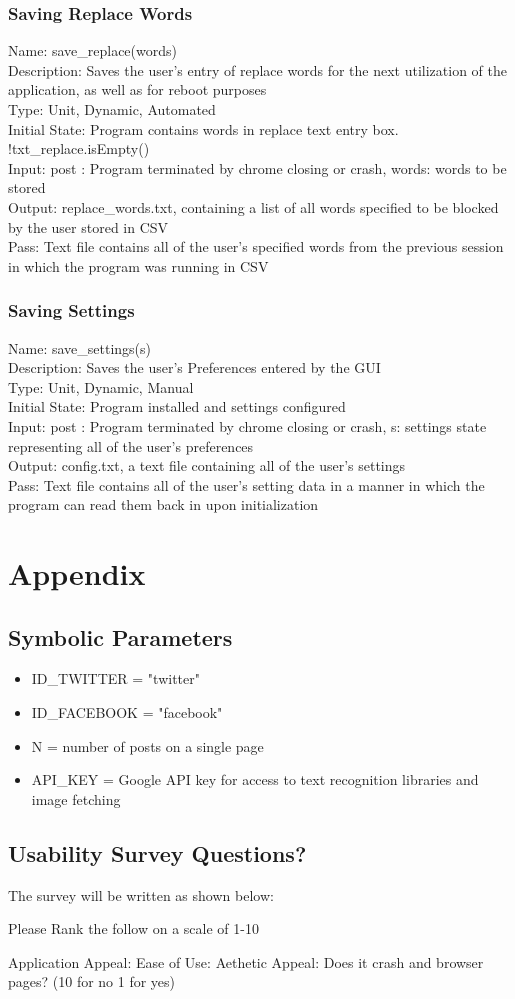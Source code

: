 \documentclass[12pt, titlepage]{article}
\begin{document}
\subsubsection{Saving Replace Words}
Name: save\_replace(words) \\
Description: Saves the user's entry of replace words for the next utilization of the application, as well as for reboot purposes \\
Type: Unit, Dynamic, Automated \\
Initial State: Program contains words in replace text entry box. !txt\_replace.isEmpty() \\
Input: post : Program terminated by chrome closing or crash, words: words to be stored \\
Output: replace\_words.txt, containing a list of all words specified to be blocked by the user stored in CSV \\
Pass: Text file contains all of the user's specified words from the previous session in which the program was running in CSV\\

\subsubsection{Saving Settings}
Name: save\_settings(s) \\
Description: Saves the user's Preferences entered by the GUI \\
Type: Unit, Dynamic, Manual \\
Initial State: Program installed and settings configured \\
Input: post : Program terminated by chrome closing or crash, s: settings state representing all of the user's preferences \\
Output: config.txt, a text file containing all of the user's settings \\
Pass: Text file contains all of the user's setting data in a manner in which the program can read them back in upon initialization\\

\newpage
\section{Appendix}
\subsection{Symbolic Parameters}
\begin{itemize}
  \item ID\_TWITTER = "twitter"
  \item ID\_FACEBOOK = "facebook"
  \item N = number of posts on a single page
  \item API\_KEY = Google API key for access to text recognition libraries and image fetching
\end{itemize}
\subsection{Usability Survey Questions?}
The survey will be written as shown below:

Please Rank the follow on a scale of 1-10

Application Appeal:
Ease of Use:
Aethetic Appeal:
Does it crash and browser pages? (10 for no 1 for yes)
\end{document}

